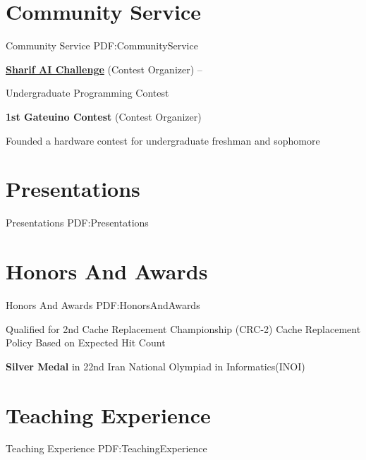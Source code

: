 \documentclass[a4paper,9pt,oneside]{article}
\begin{document}
\begin{body}
\section
{Community Service}
{Community Service}
{PDF:CommunityService}

\BulletItem
\href{https://github.com/SharifAIChallenge}{
\textbf{Sharif AI Challenge}} (Contest Organizer)
\hfill
{} --

\SubBulletItem
Undergraduate Programming Contest

\BulletItem
\textbf{1st Gateuino Contest} (Contest Organizer)
\hfill
{}

\SubBulletItem
Founded a hardware contest for undergraduate freshman and sophomore

\section
{Presentations}
{Presentations}
{PDF:Presentations}


\section
{Honors\newline
And\newline
Awards}
{Honors\newline
And\newline
Awards}
{PDF:HonorsAndAwards}

\BulletItem
Qualified for 2nd Cache Replacement Championship (CRC-2)
\SubBulletItem
Cache Replacement Policy Based on Expected Hit Count
\hfill
{}


\BulletItem
\textbf{Silver Medal} in 22nd Iran National Olympiad in Informatics(INOI)
\hfill
{}



\section
{Teaching Experience}
{Teaching Experience}
{PDF:TeachingExperience}



\end{body}
\end{document}
